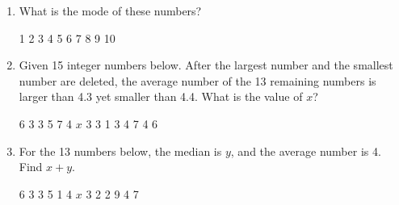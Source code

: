 \documentclass[11pt]{scrartcl}
\begin{document}
\begin{enumerate}
    \item What is the mode of these numbers?
        \begin{tcolorbox}[colback=blue!10!white,colframe=blue!75!black,box align=center,
            halign=center,
            valign=center]
            1 2 3 4 5 6 7 8 9 10
        \end{tcolorbox}
    
    \item Given 15 integer numbers below. After the largest number and the smallest number are deleted, the average number of the 13 remaining numbers is larger than 4.3 yet smaller than 4.4. What is the value of $x$?
        \begin{tcolorbox}[colback=green!10!white,colframe=green!75!black,box align=center,
        halign=center,
        valign=center]
        6  3  3  5  7  4  $x$  3  3  1  3  4  7  4  6
        \end{tcolorbox}

    \item For the 13 numbers below, the median is $y$, and the average number is 4. Find $x+y$.   
       \begin{tcolorbox}[colback=red!10!white,colframe=red!75!black,box align=center,
        halign=center,
        valign=center]
        6 3 3 5 1 4 $x$ 3 2 2 9 4 7
        \end{tcolorbox}

\end{enumerate}
\end{document}
